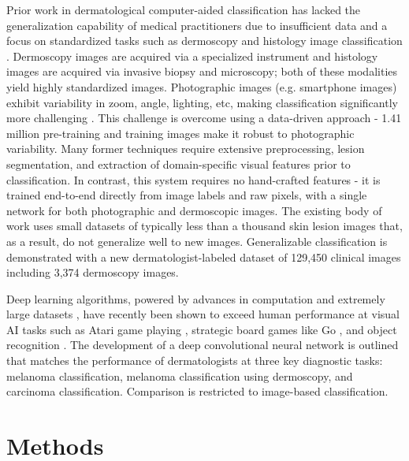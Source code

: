 Prior work in dermatological computer-aided classification \cite{masood2013computer, rosado2003accuracy, burroni2004melanoma} has lacked the generalization capability of medical practitioners due to insufficient data and a focus on standardized tasks such as dermoscopy \cite{kittler2002diagnostic, codella2015deep, codella2018skin} and histology image classification \cite{binder1998epiluminescence, altmeyer1997skin, clark1989model, schindewolf1993classification}. Dermoscopy images are acquired via a specialized instrument and histology images are acquired via invasive biopsy and microscopy; both of these modalities yield highly standardized images. Photographic images (e.g. smartphone images) exhibit variability in zoom, angle, lighting, etc, making classification significantly more challenging \cite{ramlakhan2011mobile, ballerini2013color}. This challenge is overcome using a data-driven approach - 1.41 million pre-training and training images make it robust to photographic variability. Many former techniques require extensive preprocessing, lesion segmentation, and extraction of domain-specific visual features prior to classification. In contrast, this system requires no hand-crafted features - it is trained end-to-end directly from image labels and raw pixels, with a single network for both photographic and dermoscopic images. The existing body of work uses small datasets of typically less than a thousand skin lesion images \cite{kittler2002diagnostic, codella2018skin, binder1998epiluminescence} that, as a result, do not generalize well to new images. Generalizable classification is demonstrated with a new dermatologist-labeled dataset of 129,450 clinical images including 3,374 dermoscopy images.

Deep learning algorithms, powered by advances in computation and extremely large datasets \cite{deng2009imagenet}, have recently been shown to exceed human performance at visual AI tasks such as Atari game playing \cite{mnih2015human}, strategic board games like Go \cite{silver2016mastering}, and object recognition \cite{russakovsky2015imagenet}. The development of a deep convolutional neural network is outlined that matches the performance of dermatologists at three key diagnostic tasks: melanoma classification, melanoma classification using dermoscopy, and carcinoma classification.  Comparison is restricted to image-based classification.

\section{Methods}

